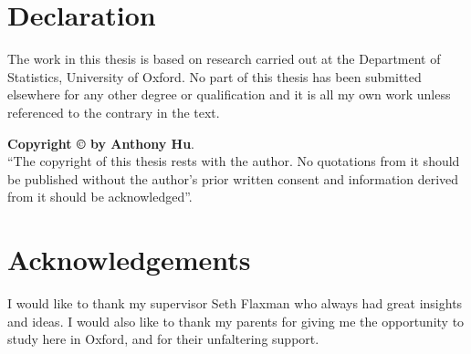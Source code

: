 

\chapter*{Declaration}
The work in this thesis is based on research carried out at the Department of Statistics, University of Oxford. No part of this thesis has been submitted elsewhere for any other degree or qualification and it is all my own work unless referenced to the contrary in the text.


\vfill
\noindent \textbf{Copyright \copyright{} by Anthony Hu}.\\
``The copyright of this thesis rests with the author.  No quotations
from it should be published without the author's prior written consent
and information derived from it should be acknowledged''.



\chapter*{Acknowledgements}
I would like to thank my supervisor Seth Flaxman who always had great insights and ideas. I would also like to thank my parents for giving me the opportunity to study here in Oxford, and for their unfaltering support.


